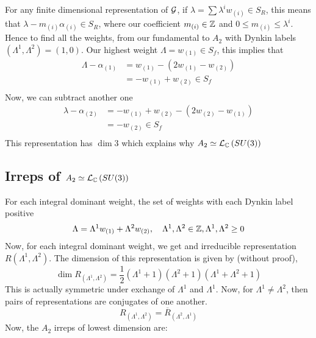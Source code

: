 For any finite dimensional representation of  $ \mathcal{ G } $, 
if $ \lambda = \sum \lambda ^ i w _{ \left( i  \right)  } \in S _ R $, this 
means that $ \lambda - m _{ \left(  i  \right)  } \alpha _{ \left( i  \right)  } \in S _ R $, 
where our coefficient $ m _{ \left( i  \right)  } \in \mathbb{Z} $ and $ 0 \leq 
m _{ \left( i  \right)  } \leq \lambda ^ i $. 
Hence to find all the weights, 
from our fundamental to $ A _ 2 $ with Dynkin labels
$ \left( \Lambda ^ 1, \Lambda ^ 2  \right)  = \left( 1, 0  \right)  $. 
Our highest weight $ \Lambda  = w _{ \left( 1  \right)  } \in S _ f $, 
this implies that 
\begin{align*}
	\Lambda  - \alpha _{ \left( 1  \right)  } &=  w _{ \left(   1  \right)  }  - 
	\left( 2 w _{ \left( 1  \right)  }  - w _{ \left( 2  \right)  }  \right)  \\ 
						  &=  - w _{ \left(  1  \right)  } + w _{ \left( 2  \right)  } 
						  \in S _f \\ 
\end{align*}
Now, we can subtract another one 
\begin{align*}
	\lambda - \alpha _{ \left( 2  \right)  } &=  - w _{ \left(  1  \right)  } + w _{ \left(  2  \right)  } 
	- \left(  2 w _{ \left( 2  \right)  } - w _{ \left( 1  \right)  }  \right)  \\ 
						 &=  - w _{ \left( 2  \right)  } \in S _ f  \\
\end{align*} 
This representation has $ \dim 3 $ which explains why $ A _ 2 \simeq \mathcal{ L } _{ \mathbb{C} } \left( SU ( 3 )  \right) $


\subsection{Irreps of $ A _ 2 \simeq \mathcal{ L } _{\mathbb{C} } \left(  SU ( 3 )  \right) $ } 
For each integral dominant weight, 
the set of weights with each Dynkin label positive
\[
	\Lambda  = \Lambda ^ 1 w _{ \left( 1  \right)  } + \Lambda ^ 2 w _{ \left( 2  \right)  } , \quad \Lambda ^ 1 , \Lambda ^ 2 \in \mathbb{Z}, \Lambda ^ 1 , \Lambda ^ 2 \geq 0 
\] Now, for each integral dominant weight, 
we get and irreducible representation $ R ( \Lambda ^ 1 , \Lambda ^ 2 ) $. 
The dimension of this representation is 
given by (without proof), 
\[
	\dim R _{ \left( \Lambda ^ 1, \Lambda ^  2  \right)  }  = 
	\frac{1}{2 } \left( \Lambda ^  1  + 1\right)  \left(\Lambda ^  2+ 1   \right) 
	\left( \Lambda ^ 1 + \Lambda ^ 2 + 1  \right) 
\]  This is actually symmetric under exchange 
of $ \Lambda ^ 1 $ and $ \Lambda ^ 1 $. 
Now, for $ \Lambda ^ 1 \neq \Lambda ^ 2 $, then pairs 
of representations are conjugates of one another. 
\[
	R _{ \left( \Lambda ^  1 , \Lambda ^ 2  \right)  }  = 
	\overline{ R } _{ \left( \Lambda ^ 2 , \Lambda ^ 1  \right)  }
\] Now, the $ A _ 2 $ irreps of lowest dimension 
are: 

